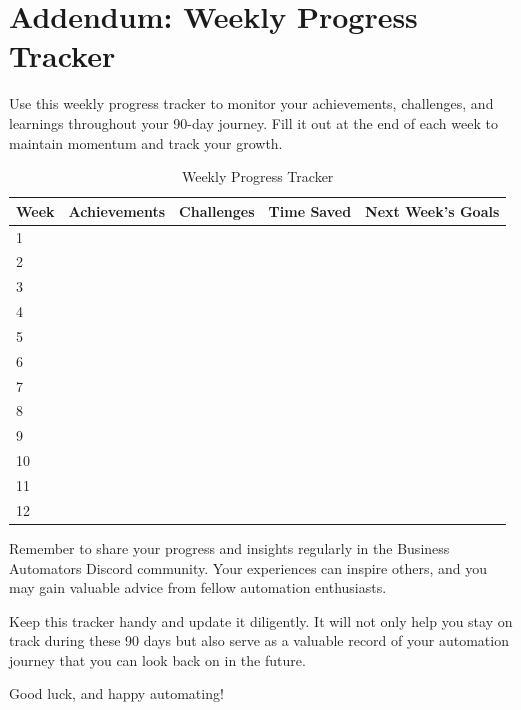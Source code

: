 \clearpage

\section{Addendum: Weekly Progress Tracker}

Use this weekly progress tracker to monitor your achievements, challenges, and learnings throughout your 90-day journey. Fill it out at the end of each week to maintain momentum and track your growth.

\begin{table}[h]
    \centering
    \begin{tabular}{|p{2cm}|p{3cm}|p{3cm}|p{3cm}|p{3cm}|}
        \hline
        \textbf{Week} & \textbf{Achievements} & \textbf{Challenges} & \textbf{Time Saved} & \textbf{Next Week's Goals} \\
        \hline
        1 &  &  &  &  \\
        \hline
        2 &  &  &  &  \\
        \hline
        3 &  &  &  &  \\
        \hline
        4 &  &  &  &  \\
        \hline
        5 &  &  &  &  \\
        \hline
        6 &  &  &  &  \\
        \hline
        7 &  &  &  &  \\
        \hline
        8 &  &  &  &  \\
        \hline
        9 &  &  &  &  \\
        \hline
        10 &  &  &  &  \\
        \hline
        11 &  &  &  &  \\
        \hline
        12 &  &  &  &  \\
        \hline
    \end{tabular}
    \caption{Weekly Progress Tracker}
    \label{tab:progress-tracker}
\end{table}

Remember to share your progress and insights regularly in the Business Automators Discord community. Your experiences can inspire others, and you may gain valuable advice from fellow automation enthusiasts.

Keep this tracker handy and update it diligently. It will not only help you stay on track during these 90 days but also serve as a valuable record of your automation journey that you can look back on in the future.

Good luck, and happy automating!